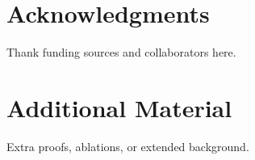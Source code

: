\documentclass[11pt,a4paper]{article}
\numberwithin{equation}{section}
\begin{document}
\section*{Acknowledgments}
Thank funding sources and collaborators here.



\appendix
\section{Additional Material}
Extra proofs, ablations, or extended background.

%
%
\end{document}
